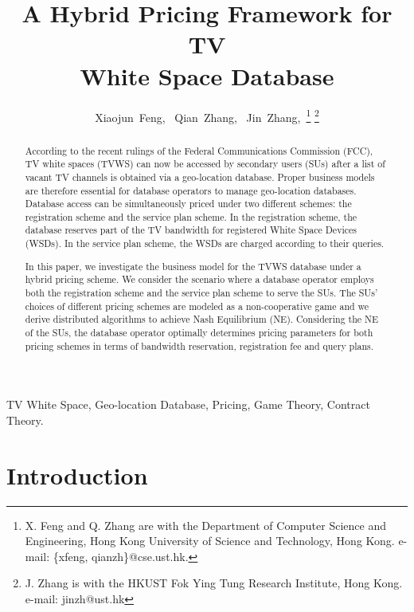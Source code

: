 \documentclass[journal]{IEEEtran}
\begin{document}
\title{A Hybrid Pricing Framework for TV \\White Space Database}

\author{Xiaojun~Feng,~
        Qian~Zhang,~
        Jin~Zhang,~\thanks{X. Feng and Q. Zhang are with the Department of Computer Science and Engineering, Hong Kong University of Science and Technology, Hong Kong.  e-mail: \{xfeng, qianzh\}@cse.ust.hk.}
\thanks{J. Zhang is with the HKUST Fok Ying Tung Research Institute, Hong Kong. e-mail: jinzh@ust.hk}}

\maketitle
\begin{abstract}
According to the recent rulings of the Federal Communications Commission (FCC), TV white spaces (TVWS) can now be accessed by secondary users (SUs) after a list of vacant TV channels is obtained via a geo-location database. Proper business models are therefore essential for database operators to manage geo-location databases.
Database access can be simultaneously priced under two different schemes: the registration scheme and the service plan scheme.
In the registration scheme, the database reserves part of the TV bandwidth for registered White Space Devices (WSDs). In the service plan scheme, the WSDs are charged according to their queries.

In this paper, we investigate the business model for the TVWS database under a hybrid pricing scheme. We consider the scenario where a database operator employs both the registration scheme and the service plan scheme to serve the SUs. The SUs' choices of different pricing schemes are modeled as a non-cooperative game and we derive distributed algorithms to achieve Nash Equilibrium (NE). Considering the NE of the SUs, the database operator optimally determines pricing parameters for both pricing schemes in terms of bandwidth reservation, registration fee and query plans.
\end{abstract}

\begin{IEEEkeywords}
TV White Space, Geo-location Database, Pricing, Game Theory, Contract Theory.
\end{IEEEkeywords}

\section{Introduction}
\end{document}
